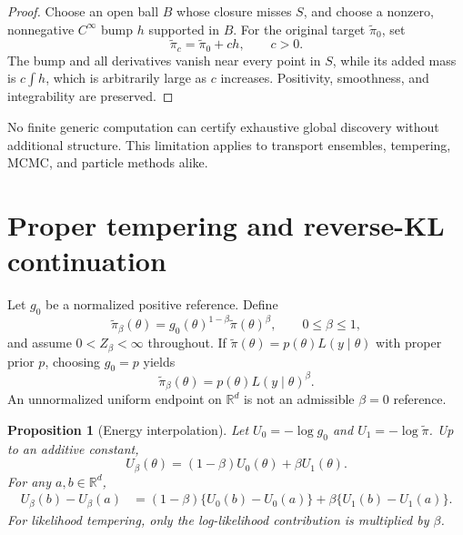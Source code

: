 \documentclass[11pt]{article}
\newtheorem{proposition}[theorem]{Proposition}
\theoremstyle{definition}
\theoremstyle{remark}
\newcommand{\R}{\mathbb{R}}
\newcommand{\1}{\mathbf{1}}
\begin{document}
\begin{proof}
Choose an open ball $B$ whose closure misses $S$, and choose a nonzero,
nonnegative $C^\infty$ bump $h$ supported in $B$.  For the original target
$\widetilde\pi_0$, set
\begin{equation}
 \widetilde\pi_c=\widetilde\pi_0+c h,
 \qquad c>0.
 \label{eq:hidden-bump}
\end{equation}
The bump and all derivatives vanish near every point in $S$, while its added
mass is $c\int h$, which is arbitrarily large as $c$ increases.  Positivity,
smoothness, and integrability are preserved.
\end{proof}

No finite generic computation can certify exhaustive global discovery without
additional structure.  This limitation applies to transport ensembles,
tempering, MCMC, and particle methods alike.

\section{Proper tempering and reverse-KL continuation}

Let $g_0$ be a normalized positive reference.  Define
\begin{equation}
 \widetilde\pi_\beta(\theta)
 =g_0(\theta)^{1-\beta}\widetilde\pi(\theta)^\beta,
 \qquad 0\leq\beta\leq1,
 \label{eq:geometric-bridge}
\end{equation}
and assume $0<Z_\beta<\infty$ throughout.  If
$\widetilde\pi(\theta)=p(\theta)L(y\mid\theta)$ with proper prior $p$, choosing
$g_0=p$ yields
\begin{equation}
 \widetilde\pi_\beta(\theta)=p(\theta)L(y\mid\theta)^\beta.
 \label{eq:likelihood-tempering}
\end{equation}
An unnormalized uniform endpoint on $\R^d$ is not an admissible $\beta=0$
reference.

\begin{proposition}[Energy interpolation]
\label{prop:energy-interpolation}
Let $U_0=-\log g_0$ and $U_1=-\log\widetilde\pi$.  Up to an additive constant,
\begin{equation}
 U_\beta(\theta)=(1-\beta)U_0(\theta)+\beta U_1(\theta).
 \label{eq:energy-interpolation}
\end{equation}
For any $a,b\in\R^d$,
\begin{align}
 U_\beta(b)-U_\beta(a)
 &=(1-\beta)\{U_0(b)-U_0(a)\}
   +\beta\{U_1(b)-U_1(a)\}.
 \label{eq:barrier-interpolation}
\end{align}
For likelihood tempering, only the log-likelihood contribution is multiplied
by $\beta$.
\end{proposition}
\end{document}

